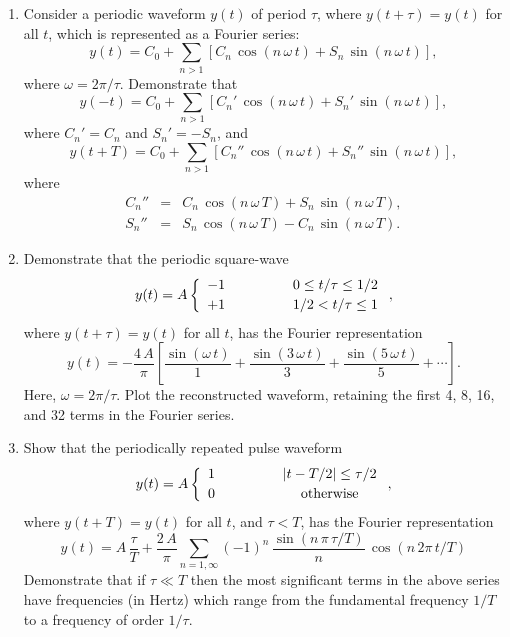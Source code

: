 {\begin{enumerate}
\item Consider a periodic waveform $y(t)$ of period $\tau$, where $y(t+\tau)=y(t)$ for
all $t$, which is represented as a Fourier series:
$$
y(t) = C_0 + \sum_{n>1}\left[C_n\,\cos(n\,\omega\,t) + S_n\,\sin(n\,\omega\,t)\right],
$$
where $\omega=2\pi/\tau$. Demonstrate that
$$
y(-t) = C_0 + \sum_{n>1}\left[C_n'\,\cos(n\,\omega\,t) + S_n'\,\sin(n\,\omega\,t)\right],
$$
where $C_n'=C_n$ and $S_n'=-S_n$, and
$$
y(t+T) = C_0 + \sum_{n>1}\left[C_n''\,\cos(n\,\omega\,t) + S_n''\,\sin(n\,\omega\,t)\right],
$$
where
\begin{eqnarray}
C_n'' &=& C_n\,\cos(n\,\omega\,T) + S_n\,\sin(n\,\omega\,T),\nonumber\\[0.5ex]
S_n'' &=& S_n\,\cos(n\,\omega\,T) - C_n\,\sin(n\,\omega\,T).\nonumber
\end{eqnarray}

\item Demonstrate that the periodic square-wave
$$
y(t)=A\left\{\begin{array}{ccc}
-1&\mbox{\hspace{1cm}}&0\leq t/\tau\leq 1/2\\[0.5ex]
+1 &&1/2<t/\tau \leq 1
\end{array}
\right.,
$$
where $y(t+\tau)=y(t)$ for all $t$, has the Fourier representation
$$
y(t) = -\frac{4\,A}{\pi}\left[\frac{\sin(\omega\,t)}{1}+ \frac{\sin(3\,\omega\,t)}{3}+ \frac{\sin(5\,\omega\,t)}{5}+\cdots\right].
$$
Here, $\omega=2\pi/\tau$. Plot the reconstructed waveform, retaining the first 4, 8, 16, and
32 terms in the Fourier series.
\item Show that the periodically repeated pulse waveform
$$
y(t)=A\left\{\begin{array}{ccc}
1&\mbox{\hspace{1cm}}&|t-T/2|\leq  \tau/2\\[0.5ex]
0 &&\mbox{otherwise}
\end{array}
\right.,
$$
where $y(t+T)=y(t)$ for all $t$, and $\tau < T$, has the Fourier representation
$$
y(t) =A\,\frac{\tau}{T} +\frac{2\,A}{\pi}\sum_{n=1,\infty} (-1)^n\,\frac{\sin (n\,\pi\,\tau/T)}{n}\,\cos(n\,2\pi\,t/T)
$$
Demonstrate that if $\tau\ll T$ then the most significant terms in the above series have
frequencies (in Hertz) which range from the fundamental frequency $1/T$ to a frequency
of order $1/\tau$. 

\end{enumerate}}